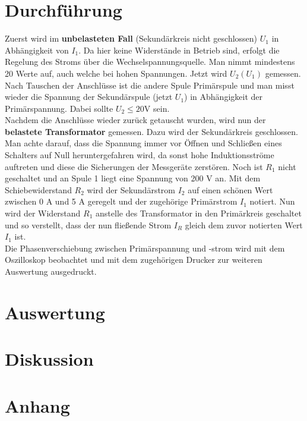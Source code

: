 \documentclass[12pt,a4paper,titlepage,headinclude,bibtotoc]{scrartcl}
\begin{document}
\section{Durchführung}
\label{sec:durchfuehrung}
Zuerst wird im \textbf{unbelasteten Fall} (Sekundärkreis nicht geschlossen) $U_1$ in Abhängigkeit von $I_1$.
Da hier keine Widerstände in Betrieb sind, erfolgt die Regelung des Stroms über die Wechselspannungsquelle.
Man nimmt mindestens 20 Werte auf, auch welche bei hohen Spannungen.
Jetzt wird $U_2(U_1)$ gemessen.
Nach Tauschen der Anschlüsse ist die andere Spule Primärspule und man misst wieder die Spannung der Sekundärspule (jetzt $U_1$) in Abhängigkeit der Primärspannung.
Dabei sollte $U_2\leq 20$V sein.\\
Nachdem die Anschlüsse wieder zurück getauscht wurden, wird nun der \textbf{belastete Transformator} gemessen.
Dazu wird der Sekundärkreis geschlossen.
Man achte darauf, dass die Spannung immer vor Öffnen und Schließen eines Schalters auf Null heruntergefahren wird, da sonst hohe Induktionsströme auftreten und diese die Sicherungen der Messgeräte zerstören.
Noch ist $R_1$ nicht geschaltet und an Spule 1 liegt eine Spannung von 200 V an.
Mit dem Schiebewiderstand $R_2$ wird der Sekundärstrom $I_2$ auf einen schönen Wert zwischen 0 A und 5 A geregelt und der zugehörige Primärstrom $I_1$ notiert.
Nun wird der Widerstand $R_1$ anstelle des Transformator in den Primärkreis geschaltet und so verstellt, dass der nun fließende Strom $I_R$ gleich dem zuvor notierten Wert $I_1$ ist.\\
Die Phasenverschiebung zwischen Primärspannung und -strom wird mit dem Oszilloskop beobachtet und mit dem zugehörigen Drucker zur weiteren Auswertung ausgedruckt.

\section{Auswertung}
\label{sec:auswertung}


\section{Diskussion}
\label{sec:diskussion}

\section{Anhang}
\end{document}

